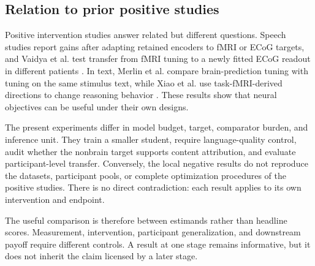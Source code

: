 \subsection{Relation to prior positive studies}
\label{sec:discussion-prior}

Positive intervention studies answer related but different questions.
Speech studies report gains after adapting retained encoders to fMRI or ECoG targets, and Vaidya et al. test transfer from fMRI tuning to a newly fitted ECoG readout in different patients \autocite{moussa2025,zhang2026,vaidya2026}.
In text, Merlin et al. compare brain-prediction tuning with tuning on the same stimulus text, while Xiao et al. use task-fMRI-derived directions to change reasoning behavior \autocite{merlinData2026,xiao2026}.
These results show that neural objectives can be useful under their own designs.

The present experiments differ in model budget, target, comparator burden, and inference unit.
They train a smaller student, require language-quality control, audit whether the nonbrain target supports content attribution, and evaluate participant-level transfer.
Conversely, the local negative results do not reproduce the datasets, participant pools, or complete optimization procedures of the positive studies.
There is no direct contradiction: each result applies to its own intervention and endpoint.

The useful comparison is therefore between estimands rather than headline scores.
Measurement, intervention, participant generalization, and downstream payoff require different controls.
A result at one stage remains informative, but it does not inherit the claim licensed by a later stage.
